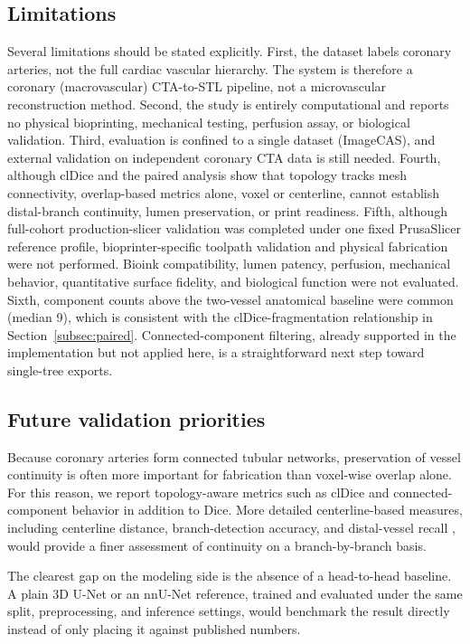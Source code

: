 \documentclass[anonymous]{iopjournal}
\begin{document}
\subsection{Limitations}
Several limitations should be stated explicitly. First, the dataset labels coronary arteries, not the full cardiac vascular hierarchy. The system is therefore a coronary (macrovascular) CTA-to-STL pipeline, not a microvascular reconstruction method. Second, the study is entirely computational and reports no physical bioprinting, mechanical testing, perfusion assay, or biological validation. Third, evaluation is confined to a single dataset (ImageCAS), and external validation on independent coronary CTA data is still needed. Fourth, although clDice and the paired analysis show that topology tracks mesh connectivity, overlap-based metrics alone, voxel or centerline, cannot establish distal-branch continuity, lumen preservation, or print readiness. Fifth, although full-cohort production-slicer validation was completed under one fixed PrusaSlicer reference profile, bioprinter-specific toolpath validation and physical fabrication were not performed. Bioink compatibility, lumen patency, perfusion, mechanical behavior, quantitative surface fidelity, and biological function were not evaluated. Sixth, component counts above the two-vessel anatomical baseline were common (median 9), which is consistent with the clDice-fragmentation relationship in Section~\ref{subsec:paired}. Connected-component filtering, already supported in the implementation but not applied here, is a straightforward next step toward single-tree exports.

\subsection{Future validation priorities}

Because coronary arteries form connected tubular networks, preservation of vessel continuity is often more important for fabrication than voxel-wise overlap alone. For this reason, we report topology-aware metrics such as clDice and connected-component behavior in addition to Dice. More detailed centerline-based measures, including centerline distance, branch-detection accuracy, and distal-vessel recall \cite{shit2021}, would provide a finer assessment of continuity on a branch-by-branch basis.

The clearest gap on the modeling side is the absence of a head-to-head baseline. A plain 3D U-Net or an nnU-Net reference, trained and evaluated under the same split, preprocessing, and inference settings, would benchmark the result directly instead of only placing it against published numbers.
\end{document}
